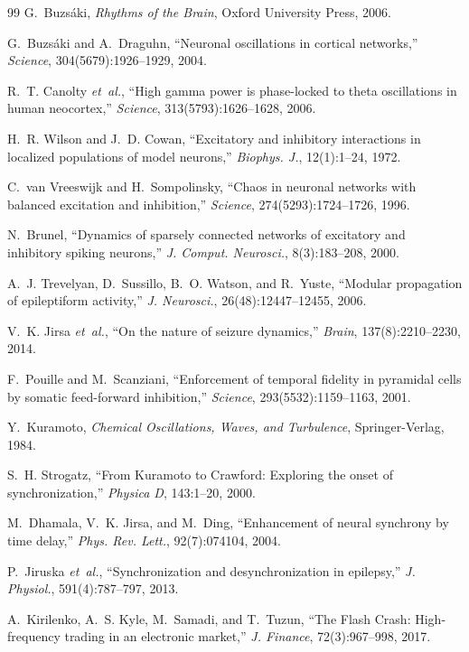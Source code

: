 \documentclass[12pt,twocolumn]{ltjsarticle}
\begin{document}
\begin{thebibliography}{99}
G.~Buzs\'{a}ki,
\textit{Rhythms of the Brain},
Oxford University Press, 2006.

G.~Buzs\'{a}ki and A.~Draguhn,
``Neuronal oscillations in cortical networks,''
\textit{Science}, 304(5679):1926--1929, 2004.

R.~T. Canolty \textit{et~al.},
``High gamma power is phase-locked to theta oscillations in human neocortex,''
\textit{Science}, 313(5793):1626--1628, 2006.

H.~R. Wilson and J.~D. Cowan,
``Excitatory and inhibitory interactions in localized populations
of model neurons,''
\textit{Biophys. J.}, 12(1):1--24, 1972.

C.~van Vreeswijk and H.~Sompolinsky,
``Chaos in neuronal networks with balanced excitation and inhibition,''
\textit{Science}, 274(5293):1724--1726, 1996.

N.~Brunel,
``Dynamics of sparsely connected networks of excitatory and
inhibitory spiking neurons,''
\textit{J. Comput. Neurosci.}, 8(3):183--208, 2000.

A.~J. Trevelyan, D.~Sussillo, B.~O. Watson, and R.~Yuste,
``Modular propagation of epileptiform activity,''
\textit{J. Neurosci.}, 26(48):12447--12455, 2006.

V.~K. Jirsa \textit{et~al.},
``On the nature of seizure dynamics,''
\textit{Brain}, 137(8):2210--2230, 2014.

F.~Pouille and M.~Scanziani,
``Enforcement of temporal fidelity in pyramidal cells by
somatic feed-forward inhibition,''
\textit{Science}, 293(5532):1159--1163, 2001.

Y.~Kuramoto,
\textit{Chemical Oscillations, Waves, and Turbulence},
Springer-Verlag, 1984.

S.~H. Strogatz,
``From Kuramoto to Crawford: Exploring the onset of synchronization,''
\textit{Physica D}, 143:1--20, 2000.

M.~Dhamala, V.~K. Jirsa, and M.~Ding,
``Enhancement of neural synchrony by time delay,''
\textit{Phys. Rev. Lett.}, 92(7):074104, 2004.

P.~Jiruska \textit{et~al.},
``Synchronization and desynchronization in epilepsy,''
\textit{J. Physiol.}, 591(4):787--797, 2013.

A.~Kirilenko, A.~S. Kyle, M.~Samadi, and T.~Tuzun,
``The Flash Crash: High-frequency trading in an electronic market,''
\textit{J. Finance}, 72(3):967--998, 2017.


\end{thebibliography}
\end{document}
